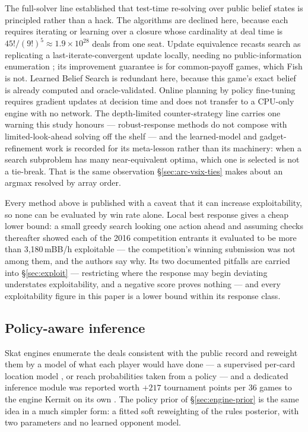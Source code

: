 The full-solver line \cite{moravcik2017deepstack,brown2020rebel,schmid2023sog} established that
test-time re-solving over public belief states is principled rather than a hack. The algorithms are
declined here, because each requires iterating or learning over a closure whose cardinality at deal
time is $45!/(9!)^5 \approx 1.9 \times 10^{28}$ deals from one seat. Update equivalence recasts
search as replicating a last-iterate-convergent update locally, needing no public-information
enumeration \cite{sokota2024updateequivalence}; its improvement guarantee is for common-payoff
games, which Fish is not. Learned Belief Search \cite{hu2021lbs} is redundant here, because this
game's exact belief is already computed and oracle-validated. Online planning by policy fine-tuning
\cite{fickinger2021rlfinetuning} requires gradient updates at decision time and does not transfer to
a CPU-only engine with no network. The depth-limited counter-strategy line
\cite{milec2021cdr,milec2025abd} carries one warning this study honours --- robust-response methods
do not compose with limited-look-ahead solving off the shelf --- and the learned-model and
gadget-refinement work \cite{kubicek2025lamir,kubicek2026refinements} is recorded for its
meta-lesson rather than its machinery: when a search subproblem has many near-equivalent optima,
which one is selected is not a tie-break. That is the same observation \S\ref{sec:arc-vsix-ties}
makes about an argmax resolved by array order.

Every method above is published with a caveat that it can increase exploitability, so none can be
evaluated by win rate alone. Local best response gives a cheap lower bound: a small greedy search
looking one action ahead and assuming checks thereafter showed each of the 2016 competition entrants
it evaluated to be more than 3{,}180\,mBB/h exploitable \cite{lisy2017lbr} --- the competition's
winning submission was not among them, and the authors say why. Its two documented pitfalls are carried into
\S\ref{sec:exploit} --- restricting where the response may begin deviating understates
exploitability, and a negative score proves nothing --- and every exploitability figure in this
paper is a lower bound within its response class.

\subsection{Policy-aware inference}
\label{sec:related-inference}

Skat engines enumerate the deals consistent with the public record and reweight them by a model of
what each player would have done --- a supervised per-card location model
\cite{solinas-supervised}, or reach probabilities taken from a policy \cite{rebstock-inference} ---
and a dedicated inference module was reported worth $+217$ tournament points per 36 games to the
engine Kermit on its own \cite{buro-kermit}. The policy prior of \S\ref{sec:engine-prior} is the
same idea in a much simpler form: a fitted soft reweighting of the rules posterior, with two
parameters and no learned opponent model.


